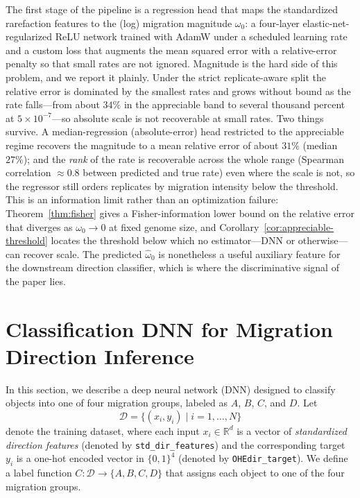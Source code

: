 \documentclass[11pt]{article}
\theoremstyle{plain}
\theoremstyle{definition}
\theoremstyle{remark}
\begin{document}
The first stage of the pipeline is a regression head that maps the standardized rarefaction features to the (log) migration magnitude $\omega_0$: a four-layer elastic-net-regularized ReLU network trained with AdamW under a scheduled learning rate and a custom loss that augments the mean squared error with a relative-error penalty so that small rates are not ignored. Magnitude is the hard side of this problem, and we report it plainly. Under the strict
replicate-aware split the relative error is dominated by the smallest rates and grows without bound
as the rate falls---from about $34\%$ in the appreciable band to several thousand percent at
$5\times10^{-7}$---so absolute scale is not recoverable at small rates. Two things survive. A
median-regression (absolute-error) head restricted to the appreciable regime recovers the magnitude
to a mean relative error of about $31\%$ (median $27\%$); and the \emph{rank} of the rate is
recoverable across the whole range (Spearman correlation $\approx 0.8$ between predicted and true
rate) even where the scale is not, so the regressor still orders replicates by migration intensity
below the threshold. This is an information limit rather than an optimization failure:
Theorem~\ref{thm:fisher} gives a Fisher-information lower bound on the relative error that diverges as
$\omega_0\to 0$ at fixed genome size, and Corollary~\ref{cor:appreciable-threshold} locates the
threshold below which no estimator---DNN or otherwise---can recover scale. The predicted $\widehat{\omega}_0$ is nonetheless a useful auxiliary feature for the downstream direction classifier, which is where the discriminative signal of the paper lies.

\section{Classification DNN for Migration Direction Inference}
\label{sec:classification_dnn}

In this section, we describe a deep neural network (DNN) designed to classify objects into one of four migration groups, labeled as \(A\), \(B\), \(C\), and \(D\). Let 
\[
\mathcal{D} = \{(x_i, y_i) \mid i=1,\dots, N\}
\]
denote the training dataset, where each input \(x_i \in \mathbb{R}^d\) is a vector of \emph{standardized direction features} (denoted by \texttt{std\_dir\_features}) and the corresponding target \(y_i\) is a one-hot encoded vector in \(\{0,1\}^4\) (denoted by \texttt{OHEdir\_target}). We define a label function \(C: \mathcal{D} \to \{A, B, C, D\}\) that assigns each object to one of the four migration groups.
\end{document}
